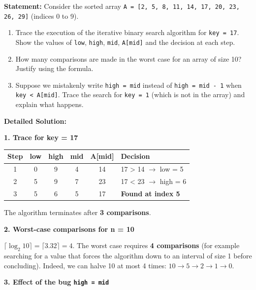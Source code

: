 \documentclass[11pt]{article}
\begin{document}
\begin{exoresolu}
\textbf{Statement:} Consider the sorted array \texttt{A = [2, 5, 8, 11, 14, 17, 20, 23, 26, 29]} (indices 0 to 9).
\begin{enumerate}
    \item Trace the execution of the iterative binary search algorithm for \texttt{key = 17}. Show the values of \texttt{low}, \texttt{high}, \texttt{mid}, \texttt{A[mid]} and the decision at each step.
    \item How many comparisons are made in the worst case for an array of size 10? Justify using the formula.
    \item Suppose we mistakenly write \texttt{high = mid} instead of \texttt{high = mid - 1} when \texttt{key < A[mid]}. Trace the search for \texttt{key = 1} (which is not in the array) and explain what happens.
\end{enumerate}

\tcblower
\textbf{Detailed Solution:}

\textbf{1. Trace for key = 17}
\begin{center}
\begin{tabular}{|c|c|c|c|c|l|}
\hline
\rowcolor{popblueL}
Step & low & high & mid & A[mid] & Decision \\
\hline
1 & 0 & 9 & 4 & 14 & 17 > 14 $\rightarrow$ low = 5 \\
2 & 5 & 9 & 7 & 23 & 17 < 23 $\rightarrow$ high = 6 \\
3 & 5 & 6 & 5 & 17 & \textbf{Found at index 5} \\
\hline
\end{tabular}
\end{center}
The algorithm terminates after \textbf{3 comparisons}.

\textbf{2. Worst-case comparisons for n = 10}

$\lceil \log_2 10 \rceil = \lceil 3.32 \rceil = 4$. The worst case requires \textbf{4 comparisons} (for example searching for a value that forces the algorithm down to an interval of size 1 before concluding). Indeed, we can halve 10 at most 4 times: $10 \to 5 \to 2 \to 1 \to 0$.

\textbf{3. Effect of the bug \texttt{high = mid}}


\end{exoresolu}
\end{document}
